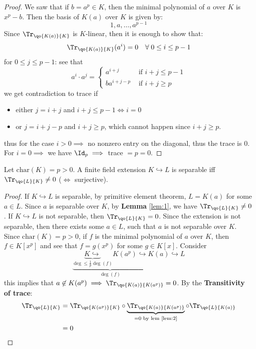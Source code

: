 \begin{proof}
	We saw that if \( b = a^p \in K \), then the minimal polynomial of \( a \) over \( K \) is \( x^p
	- b\). Then the basis of \( K(a) \) over \( K \) is given by:
	\[
		1, a, \ldots, a^{p-1}
	\]
	Since \( \Tr_{\qo{K(a)}{K}} \) is \( K \)-linear, then it is enough to show that:
	\[
		\Tr_{\qo{K(a)}{K}} (a^i) = 0 \quad \forall \; 0 \leq i \leq p-1
	\]
	for \( 0 \leq j \leq p-1 \): see that
	\[
		a^i \cdot a^j =
		\begin{cases}
			a^{i+j}     & \text{ if } i+j \leq p-1 \\
			b a^{i+j-p} & \text{ if } i+j \geq p
		\end{cases}
	\]
	we get contradiction to trace if
	\begin{itemize}
		\item either \( j = i+j \) and \( i + j \leq p-1 \iff i = 0 \)
		\item or \( j = i+j - p \) and \( i+j \geq p \), which cannot happen since \( i+j \geq p \).
	\end{itemize}
	thus for the case \( i > 0 \implies  \) no nonzero entry on the diagonal, thus the trace is \( 0 \). For
	\( i = 0 \implies \) we have \( \Id_p \implies \) trace \( =p = 0 \).
\end{proof}

\begin{theorem}
	\label{thm:theorem}
	Let \( \text{char}(K) = p > 0 \). A finite field extension \( K \hookrightarrow L \) is separable iff \( \Tr_{\qo{L}{K}} \ne 0\) (\( \iff \) surjective).
\end{theorem}

\begin{proof}
	If \( K \hookrightarrow L \) is separable, by primitive element theorem, \( L = K(a) \) for some
	\( a \in L \). Since \( a \) is separable over \( K \), by \textbf{Lemma} \ref{lem:1}, we
	have \( \Tr_{\qo{L}{K}} \ne 0 \). If \( K \hookrightarrow L \) is not separable, then \(
	\Tr_{\qo{L}{K}} = 0 \). Since the extension is not separable, then there exists some \( a\in L \),
	such that \( a \) is not separable over \( K \). Since \( \text{char}(K) = p > 0 \), if \( f \) is
	the minimal polynomial of \( a \) over \( K \), then \( f \in K[x^p] \) and see that \( f = g(x^p) \)
	for some \( g \in K[x] \). Consider
	\[
		\underbrace{\underbrace{K \hookrightarrow}_{\deg \leq \frac{1}{p}\deg(f)} K(a^p) \hookrightarrow}_{\deg(f)}
		K(a) \hookrightarrow L
	\]
	this implies that \( a\not\in K(a^p) \implies \Tr_{\qo{K(a)}{K(a^p)}} = 0 \). By the
	\textbf{Transitivity of trace}:
	\[
		\begin{aligned}
			\Tr_{\qo{L}{K}} & = \Tr_{\qo{K(a^p)}{K}} \circ \underbrace{\Tr_{\qo{K(a)}{K(a^p)}}}_{= 0 \text{ by lem \ref{lem:2}}} \circ \Tr_{\qo{L}{K(a)}}
			\\
			                & = 0
		\end{aligned}
	\]
\end{proof}

